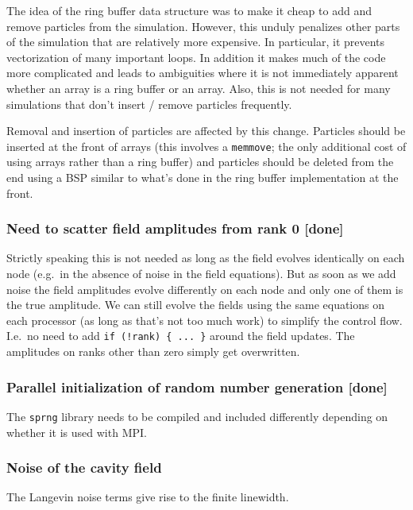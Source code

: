 \documentclass[aps, superscriptaddress, groupedaddress, preprint]{revtex4}
\begin{document}
The idea of the ring buffer data structure was to make it cheap
to add and remove particles from the simulation.  However, this
unduly penalizes other parts of the simulation that are
relatively more expensive.  In particular, it prevents
vectorization of many important loops.  In addition it makes much
of the code more complicated and leads to ambiguities where it is
not immediately apparent whether an array is a ring buffer or an
array.  Also, this is not needed for many simulations that don't
insert / remove particles frequently.

Removal and insertion of particles are affected by this change.
Particles should be inserted at the front of arrays (this
involves a \verb~memmove~; the only additional cost of using
arrays rather than a ring buffer) and particles should be deleted
from the end using a BSP similar to what's done in the ring
buffer implementation at the front.


\subsubsection{Need to scatter field amplitudes from rank 0 {\bf
[done]}}

Strictly speaking this is not needed as long as the field evolves
identically on each node (e.g.\ in the absence of noise in the
field equations).  But as soon as we add noise the field
amplitudes evolve differently on each node and only one of them
is the true amplitude.  We can still evolve the fields using the
same equations on each processor (as long as that's not too much
work) to simplify the control flow.  I.e.\ no need to add 
\verb~if (!rank) { ... }~ around the field updates.  The
amplitudes on ranks other than zero simply get overwritten.


\subsubsection{Parallel initialization of random number
generation {\bf [done]}}

The \verb~sprng~ library needs to be compiled and included
differently depending on whether it is used with MPI\@.


\subsubsection{Noise of the cavity field}

The Langevin noise terms give rise to the finite linewidth.
\end{document}
